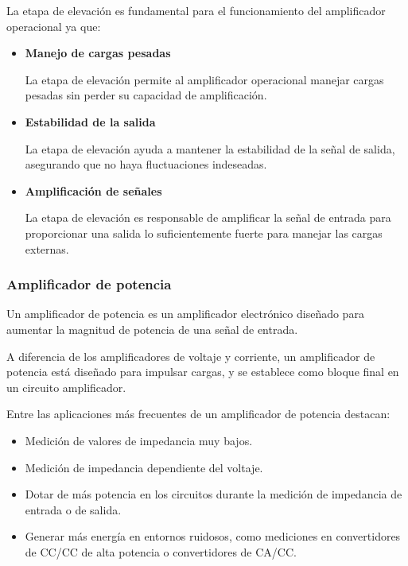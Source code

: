 La etapa de elevación es fundamental para el funcionamiento del amplificador operacional ya que:

\begin{itemize}
    \item \textbf{Manejo de cargas pesadas}

          La etapa de elevación permite al amplificador operacional manejar cargas pesadas sin perder su capacidad de amplificación.

    \item \textbf{Estabilidad de la salida}

          La etapa de elevación ayuda a mantener la estabilidad de la señal de salida, asegurando que no haya fluctuaciones indeseadas.

    \item \textbf{Amplificación de señales}

          La etapa de elevación es responsable de amplificar la señal de entrada para proporcionar una salida lo suficientemente fuerte para manejar las cargas externas.

\end{itemize}

\subsubsection{Amplificador de potencia}
Un amplificador de potencia es un amplificador electrónico diseñado para aumentar la magnitud de potencia de una señal de entrada.

A diferencia de los amplificadores de voltaje y corriente, un amplificador de potencia está diseñado para impulsar cargas, y se establece como bloque final en un circuito amplificador.

Entre las aplicaciones más frecuentes de un amplificador de potencia destacan:

\begin{itemize}
    \item Medición de valores de impedancia muy bajos.
    \item Medición de impedancia dependiente del voltaje.
    \item Dotar de más potencia en los circuitos durante la medición de impedancia de entrada o de salida.
    \item Generar más energía en entornos ruidosos, como mediciones en convertidores de CC/CC de alta potencia o convertidores de CA/CC.
\end{itemize}

